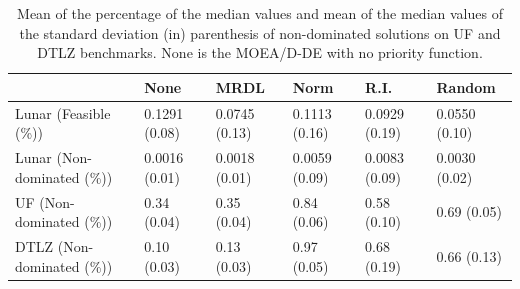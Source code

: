 \begin{table}[!t]
	\begin{tabular}{llllll}
		\cline{6-6}
		\hline
		\rowcolor[gray]{.7} \multicolumn{1}{|l|}{Benchmark -- Priority Function}         & \multicolumn{1}{l|}{None} & \multicolumn{1}{l|}{MRDL} & \multicolumn{1}{l|}{Norm} & \multicolumn{1}{l|}{R.I.} & \multicolumn{1}{l|}{Random} \\ \hline \hline  \hline

		Lunar (Feasible (\%))           & 0.1291 (0.08) & 0.0745 (0.13) & 0.1113 (0.16) & 0.0929 (0.19)             & 0.0550 (0.10) \\

		\rowcolor[gray]{.95}Lunar (Non-dominated (\%))           & 0.0016 (0.01) &0.0018 (0.01) & 0.0059 (0.09) & 0.0083 (0.09)             & 0.0030 (0.02) \\%

		 UF (Non-dominated (\%))              & 0.34 (0.04) & 0.35 (0.04) & 0.84 (0.06) & 0.58 (0.10)             & 0.69 (0.05) \\ %

		\rowcolor[gray]{.95}DTLZ (Non-dominated (\%))              & 0.10 (0.03) & 0.13 (0.03) & 0.97 (0.05) & 0.68 (0.19)             &  0.66 (0.13) \\ %

	\end{tabular}
	\caption{Mean of the percentage of the median values and mean of the median values of the standard deviation (in) parenthesis of non-dominated solutions on UF and DTLZ benchmarks. None is the MOEA/D-DE with no priority function.}
	\label{minor_results}
\end{table}

